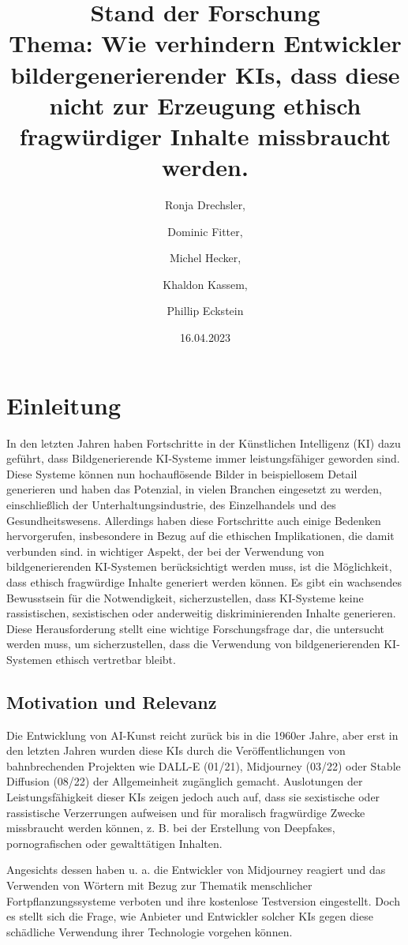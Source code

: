 \documentclass[12pt]{article}
\title{Stand der Forschung \\[1ex] \large Thema: Wie verhindern Entwickler bildergenerierender KIs, dass diese nicht zur Erzeugung ethisch fragwürdiger Inhalte missbraucht werden.}
\date{16.04.2023}
\author{Ronja Drechsler, \and Dominic Fitter, \and Michel Hecker, \and Khaldon Kassem, \and Phillip Eckstein}
\begin{document}
\maketitle
\tableofcontents
\section{Einleitung}
In den letzten Jahren haben Fortschritte in der Künstlichen Intelligenz (KI) dazu geführt, dass Bildgenerierende KI-Systeme immer 
leistungsfähiger geworden sind. Diese Systeme können nun hochauflösende Bilder in beispiellosem Detail generieren und haben das Potenzial,
 in vielen Branchen eingesetzt zu werden, einschließlich der Unterhaltungsindustrie, des Einzelhandels und des Gesundheitswesens. 
 Allerdings haben diese Fortschritte auch einige Bedenken hervorgerufen, insbesondere in Bezug auf die ethischen Implikationen, 
 die damit verbunden sind.
 in wichtiger Aspekt, der bei der Verwendung von bildgenerierenden KI-Systemen berücksichtigt werden muss, ist die Möglichkeit, dass ethisch fragwürdige Inhalte generiert werden können. Es gibt ein wachsendes Bewusstsein für die Notwendigkeit, sicherzustellen, dass KI-Systeme keine rassistischen, sexistischen oder anderweitig diskriminierenden Inhalte generieren. Diese Herausforderung stellt eine wichtige Forschungsfrage dar, die untersucht werden muss, um sicherzustellen, dass die Verwendung von bildgenerierenden KI-Systemen ethisch vertretbar bleibt.

 \subsection{Motivation und Relevanz}
 Die Entwicklung von AI-Kunst reicht zurück bis in die 1960er Jahre, aber erst in den letzten Jahren wurden diese KIs durch die Veröffentlichungen von bahnbrechenden Projekten wie DALL-E (01/21), Midjourney (03/22) oder Stable Diffusion (08/22) der Allgemeinheit zugänglich gemacht. Auslotungen der Leistungsfähigkeit dieser KIs zeigen jedoch auch auf, dass sie sexistische oder rassistische Verzerrungen aufweisen und für moralisch fragwürdige Zwecke missbraucht werden können, z. B. bei der Erstellung von Deepfakes, pornografischen oder gewalttätigen Inhalten.

 Angesichts dessen haben u. a. die Entwickler von Midjourney reagiert und das Verwenden von Wörtern mit Bezug zur Thematik menschlicher Fortpflanzungssysteme verboten und ihre kostenlose Testversion eingestellt. Doch es stellt sich die Frage, wie Anbieter und Entwickler solcher KIs gegen diese schädliche Verwendung ihrer Technologie vorgehen können.
 
\end{document}
